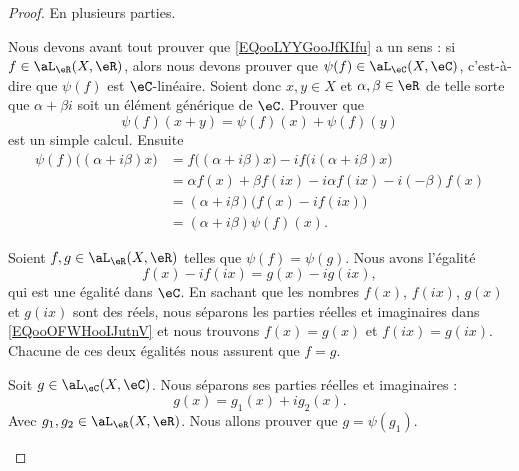 \begin{proof}
	En plusieurs parties.
	\begin{subproof}
		Nous devons avant tout prouver que \eqref{EQooLYYGooJfKIfu} a un sens : si \( f\in \aL_{\eR}(X,\eR)\), alors nous devons prouver que \( \psi(f)\in\aL_\eC(X,\eC)\), c'est-à-dire que \( \psi(f)\) est \( \eC\)-linéaire. Soient donc \( x,y\in X\) et \( \alpha,\beta\in \eR\) de telle sorte que \( \alpha+\beta i\) soit un élément générique de \( \eC\). Prouver que
		\begin{equation}
			\psi(f)(x+y)=\psi(f)(x)+\psi(f)(y)
		\end{equation}
		est un simple calcul. Ensuite
		\begin{subequations}
			\begin{align}
				\psi(f)\big( (\alpha+i\beta)x \big) & =f\big( (\alpha+i\beta)x \big)-if\big( i(\alpha+i\beta)x \big) \\
				                                    & =\alpha f(x)+\beta f(ix)-i\alpha f(ix)-i(-\beta)f(x)           \\
				                                    & =(\alpha+i\beta)\big( f(x)-if(ix) \big)                        \\
				                                    & =(\alpha+i\beta)\psi(f)(x).
			\end{align}
		\end{subequations}

		Soient \( f,g\in \aL_{\eR}(X,\eR)\) telles que \( \psi(f)=\psi(g)\). Nous avons l'égalité
		\begin{equation}        \label{EQooOFWHooIJutnV}
			f(x)-if(ix)=g(x)-ig(ix),
		\end{equation}
		qui est une égalité dans \( \eC\). En sachant que les nombres \( f(x)\), \( f(ix)\), \( g(x)\) et \( g(ix)\) sont des réels, nous séparons les parties réelles et imaginaires dans \eqref{EQooOFWHooIJutnV} et nous trouvons \( f(x)=g(x)\) et \( f(ix)=g(ix)\). Chacune de ces deux égalités nous assurent que \( f=g\).

		Soit \( g\in \aL_{\eC}(X,\eC)\). Nous séparons ses parties réelles et imaginaires :
		\begin{equation}
			g(x)=g_1(x)+ig_2(x).
		\end{equation}
		Avec \( g_1,g_2\in \aL_{\eR}(X,\eR)\). Nous allons prouver que \( g=\psi(g_1)\).


\end{subproof}
\end{proof}
